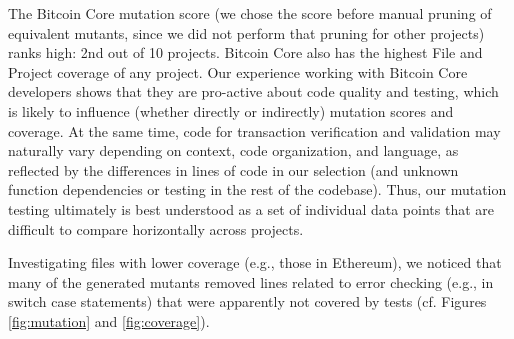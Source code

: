 The Bitcoin Core mutation score (we chose the score before manual
pruning of equivalent mutants, since we did not perform that pruning
for other projects) ranks high: 2nd out of 10 projects. Bitcoin Core
also has the highest File and Project coverage of any project.  Our experience
working with Bitcoin Core developers shows that they are pro-active about code
quality and testing, which is likely to influence (whether directly or
indirectly) mutation scores and coverage.  At the same time, code
for transaction verification and validation may naturally vary depending on
context, code organization, and language, as reflected by the differences in
lines of code in our selection (and unknown function dependencies or testing in
the rest of the codebase). Thus, our mutation testing
ultimately is best understood as a set of individual data points that are difficult to compare
horizontally across projects.
%



%
%

%

Investigating files with lower coverage (e.g., those in Ethereum), we noticed
that many of the generated mutants removed lines related to error checking
(e.g., in switch case statements) that were apparently not covered by tests (cf.
Figures \ref{fig:mutation} and \ref{fig:coverage}).

